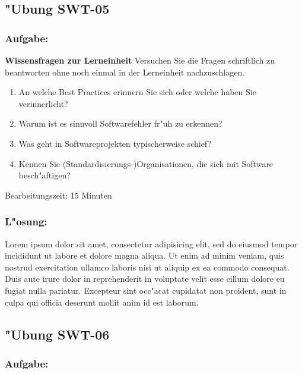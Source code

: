 \newpage
\subsection{"Ubung SWT-05}
\subsubsection*{Aufgabe:}

\begin{framed}
\textbf{Wissensfragen zur Lerneinheit}
\smallbreak
Versuchen Sie die Fragen schriftlich zu beantworten ohne noch einmal in der Lerneinheit nachzuschlagen.
\begin{enumerate}
\item An welche Best Practices erinnern Sie sich oder welche haben Sie verinnerlicht?
\item Warum ist es sinnvoll Softwarefehler fr"uh zu erkennen?
\item Was geht in Softwareprojekten typischerweise schief?
\item Kennen Sie (Standardisierungs-)Organisationen, die sich mit Software besch"aftigen?
\end{enumerate}
\bigbreak
\small Bearbeitungszeit: 15 Minuten
\end{framed}
\bigbreak
\bigbreak
\subsubsection*{L"osung:}
Lorem ipsum dolor sit amet, consectetur adipisicing elit, sed do eiusmod tempor incididunt ut labore et dolore magna aliqua. Ut enim ad minim veniam, quis nostrud exercitation ullamco laboris nisi ut aliquip ex ea commodo consequat. Duis aute irure dolor in reprehenderit in voluptate velit esse cillum dolore eu fugiat nulla pariatur. Excepteur sint occ"acat cupidatat non proident, sunt in culpa qui officia deserunt mollit anim id est laborum.

\newpage
\subsection{"Ubung SWT-06}
\subsubsection*{Aufgabe:}

